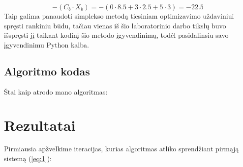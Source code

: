 \documentclass{article}
\begin{document}
\begin{equation*}
    -(C_b\cdot X_b) = -(0\cdot8.5+3\cdot2.5+5\cdot3) = -22.5
\end{equation*}
Taip galima panaudoti simplekso metodą tiesiniam optimizavimo uždaviniui spręsti rankiniu būdu, tačiau vienas iš šio laboratorinio darbo tikslų buvo išspręsti jį taikant kodinį šio metodo įgyvendinimą, todėl pasidalinsiu savo įgyvendinimu Python kalba.
\subsection{Algoritmo kodas}
Štai kaip atrodo mano algoritmas:
\section{Rezultatai}
Pirmiausia apžvelkime iteracijas, kurias algoritmas atliko sprendžiant pirmąją sistemą (\ref{eq:1}):
\begin{table}[H]
    \centering
    \caption{Pirmos sistemos (\ref{eq:1}) simplekso lentelė pirmosios iteracijos pradžioje}
    \label{table:4}
\end{table}
\begin{table}[H]
    \centering
    \caption{Pirmos sistemos (\ref{eq:1}) simplekso lentelė antrosios iteracijos pradžioje}
    \label{table:5}
\end{table}
\begin{table}[H]
    \centering
    \caption{Pirmos sistemos (\ref{eq:1}) simplekso lentelė trečiosios iteracijos pradžioje}
    \label{table:6}
\end{table}
\end{document}
